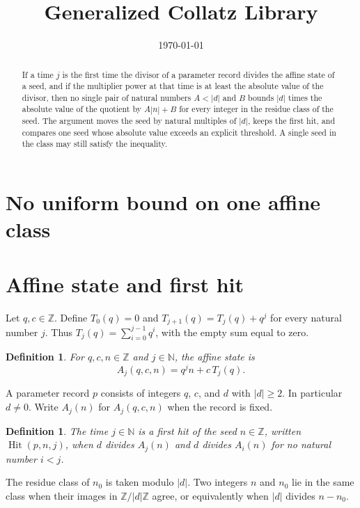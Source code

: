 \documentclass[11pt,letterpaper]{article}
\title{Generalized Collatz Library}
\author{}
\date{\today}
\newcommand{\N}{\mathbb{N}}
\newcommand{\Z}{\mathbb{Z}}
\newtheorem{definition}[theorem]{Definition}
\begin{document}
\maketitle
\section*{No uniform bound on one affine class}

\begin{abstract}
If a time \(j\) is the first time the divisor of a parameter record divides the
affine state of a seed, and if the multiplier power at that time is at least
the absolute value of the divisor, then no single pair of natural numbers
\(A<|d|\) and \(B\) bounds \(|d|\) times the absolute value of the quotient
by \(A|n|+B\) for every integer in the residue class of the seed. The argument
moves the seed by natural multiples of \(|d|\), keeps the first hit, and
compares one seed whose absolute value exceeds an explicit threshold. A single
seed in the class may still satisfy the inequality.
\end{abstract}

\section{Affine state and first hit}

Let \(q,c\in\Z\). Define \(T_0(q)=0\) and \(T_{j+1}(q)=T_j(q)+q^j\) for every
natural number \(j\). Thus \(T_j(q)=\sum_{i=0}^{j-1}q^i\), with the empty sum
equal to zero.

\begin{definition}
For \(q,c,n\in\Z\) and \(j\in\N\), the affine state is
\[
A_j(q,c,n)=q^j n+c\,T_j(q).
\]
\end{definition}

A parameter record \(p\) consists of integers \(q\), \(c\), and \(d\) with
\(|d|\ge 2\). In particular \(d\neq 0\). Write \(A_j(n)\) for
\(A_j(q,c,n)\) when the record is fixed.

\begin{definition}
The time \(j\in\N\) is a first hit of the seed \(n\in\Z\), written
\(\operatorname{Hit}(p,n,j)\), when \(d\) divides \(A_j(n)\) and \(d\) divides
\(A_i(n)\) for no natural number \(i<j\).
\end{definition}

The residue class of \(n_0\) is taken modulo \(|d|\). Two integers \(n\) and
\(n_0\) lie in the same class when their images in \(\Z/|d|\Z\) agree, or
equivalently when \(|d|\) divides \(n-n_0\).
\end{document}
